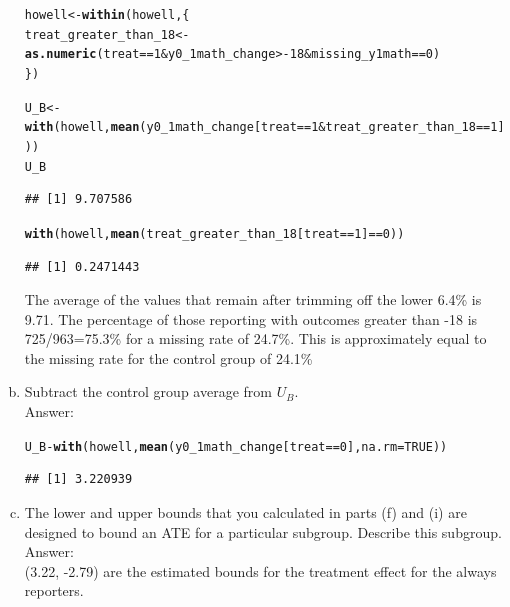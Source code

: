 \documentclass[11pt,notitlepage]{article}\usepackage[]{graphicx}\usepackage[]{color}
\makeatletter
\newcommand{\hlnum}[1]{\textcolor[rgb]{0.686,0.059,0.569}{#1}}%
\newcommand{\hlopt}[1]{\textcolor[rgb]{0,0,0}{#1}}%
\newcommand{\hlstd}[1]{\textcolor[rgb]{0.345,0.345,0.345}{#1}}%
\newcommand{\hlkwb}[1]{\textcolor[rgb]{0.69,0.353,0.396}{#1}}%
\newcommand{\hlkwc}[1]{\textcolor[rgb]{0.333,0.667,0.333}{#1}}%
\newcommand{\hlkwd}[1]{\textcolor[rgb]{0.737,0.353,0.396}{\textbf{#1}}}%
\newenvironment{kframe}{%
 \def\at@end@of@kframe{}%
 \ifinner\ifhmode%
  \def\at@end@of@kframe{\end{minipage}}%
  \begin{minipage}{\columnwidth}%
 \fi\fi%
 \def\FrameCommand##1{\hskip\@totalleftmargin \hskip-\fboxsep
 \colorbox{shadecolor}{##1}\hskip-\fboxsep
     \hskip-\linewidth \hskip-\@totalleftmargin \hskip\columnwidth}%
 \MakeFramed {\advance\hsize-\width
   \@totalleftmargin\z@ \linewidth\hsize
   \@setminipage}}%
 {\par\unskip\endMakeFramed%
 \at@end@of@kframe}
\newenvironment{knitrout}{}{} %
\makeatother
\begin{document}
\begin{enumerate}[a)]
\begin{knitrout}
\color{fgcolor}\begin{kframe}
\begin{alltt}
\hlstd{howell} \hlkwb{<-} \hlkwd{within}\hlstd{(howell,\{}
  \hlstd{treat_greater_than_18} \hlkwb{<-} \hlkwd{as.numeric}\hlstd{(treat} \hlopt{==} \hlnum{1} \hlopt{&} \hlstd{y0_1math_change} \hlopt{>-}\hlnum{18} \hlopt{&} \hlstd{missing_y1math}\hlopt{==}\hlnum{0}\hlstd{)}
\hlstd{\})}

\hlstd{U_B} \hlkwb{<-} \hlkwd{with}\hlstd{(howell,} \hlkwd{mean}\hlstd{(y0_1math_change[treat}\hlopt{==}\hlnum{1} \hlopt{&} \hlstd{treat_greater_than_18}\hlopt{==}\hlnum{1}\hlstd{]))}
\hlstd{U_B}
\end{alltt}
\begin{verbatim}
## [1] 9.707586
\end{verbatim}
\begin{alltt}
\hlkwd{with}\hlstd{(howell,} \hlkwd{mean}\hlstd{(treat_greater_than_18[treat}\hlopt{==}\hlnum{1}\hlstd{]}\hlopt{==}\hlnum{0}\hlstd{))}
\end{alltt}
\begin{verbatim}
## [1] 0.2471443
\end{verbatim}
\end{kframe}
\end{knitrout}

The average of the values that remain after trimming off the lower 6.4\% is 9.71. The percentage of those reporting with outcomes greater than -18 is 725/963=75.3\% for a missing rate of 24.7\%. This is approximately equal to the missing rate for the control group of 24.1\%

\item Subtract the control group average from $U_B$.\\
Answer:\\
\begin{knitrout}
\color{fgcolor}\begin{kframe}
\begin{alltt}
\hlstd{U_B} \hlopt{-} \hlkwd{with}\hlstd{(howell,} \hlkwd{mean}\hlstd{(y0_1math_change[treat}\hlopt{==}\hlnum{0}\hlstd{],} \hlkwc{na.rm}\hlstd{=}\hlnum{TRUE}\hlstd{))}
\end{alltt}
\begin{verbatim}
## [1] 3.220939
\end{verbatim}
\end{kframe}
\end{knitrout}



\item The lower and upper bounds that you calculated in parts (f) and (i) are designed to bound an ATE for a particular subgroup. Describe this subgroup.\\
Answer:\\
(3.22, -2.79) are the estimated bounds for the treatment effect for the always reporters. 


\end{enumerate}
\end{document}
